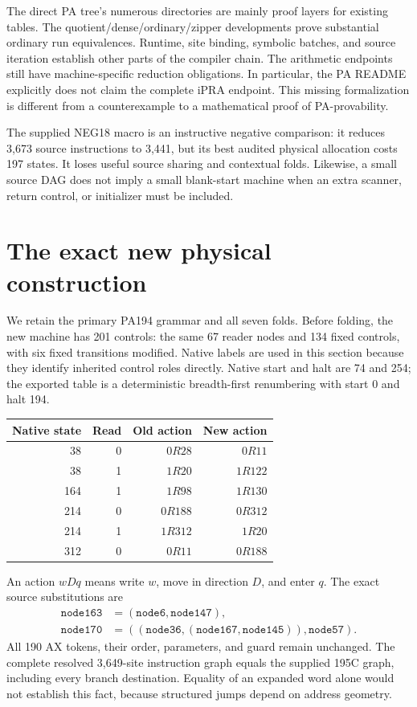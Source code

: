 \documentclass[11pt]{article}
\newcommand{\file}[1]{\texttt{\detokenize{#1}}}
\theoremstyle{definition}
\theoremstyle{remark}
\begin{document}
The direct PA tree's numerous \file{pa195-*} directories are mainly proof
layers for existing tables. The quotient/dense/ordinary/zipper developments
prove substantial ordinary run equivalences. Runtime, site binding,
symbolic batches, and source iteration establish other parts of the
compiler chain. The arithmetic endpoints still have machine-specific
reduction obligations. In particular, the PA README explicitly does not
claim the complete iPRA endpoint. This missing formalization is different
from a counterexample to a mathematical proof of PA-provability.

The supplied NEG18 macro is an instructive negative comparison: it reduces
3,673 source instructions to 3,441, but its best audited physical allocation
costs 197 states. It loses useful source sharing and contextual folds.
Likewise, a small source DAG does not imply a small blank-start machine
when an extra scanner, return control, or initializer must be included.

\section{The exact new physical construction}
\label{sec:physical}

We retain the primary PA194 grammar and all seven folds. Before folding,
the new machine has 201 controls: the same 67 reader nodes and 134 fixed
controls, with six fixed transitions modified. Native labels are used in
this section because they identify inherited control roles directly.
Native start and halt are 74 and 254; the exported table is a deterministic
breadth-first renumbering with start 0 and halt 194.

\begin{center}
\begin{tabular}{@{}rrrr@{}}
\toprule
Native state & Read & Old action & New action\\\midrule
38&0&$0R28$&$0R11$\\
38&1&$1R20$&$1R122$\\
164&1&$1R98$&$1R130$\\
214&0&$0R188$&$0R312$\\
214&1&$1R312$&$1R20$\\
312&0&$0R11$&$0R188$\\
\bottomrule
\end{tabular}
\end{center}

An action $wDq$ means write $w$, move in direction $D$, and enter $q$.
The exact source substitutions are
\[
 \begin{split}
 \texttt{node163}&=(\texttt{node6},\texttt{node147}),\\
 \texttt{node170}&=((\texttt{node36},
            (\texttt{node167},\texttt{node145})),\texttt{node57}).
 \end{split}
\]
All 190 AX tokens, their order, parameters, and guard remain unchanged.
The complete resolved 3,649-site instruction graph equals the supplied
195C graph, including every branch destination. Equality of an expanded
word alone would not establish this fact, because structured jumps depend
on address geometry.
\end{document}
